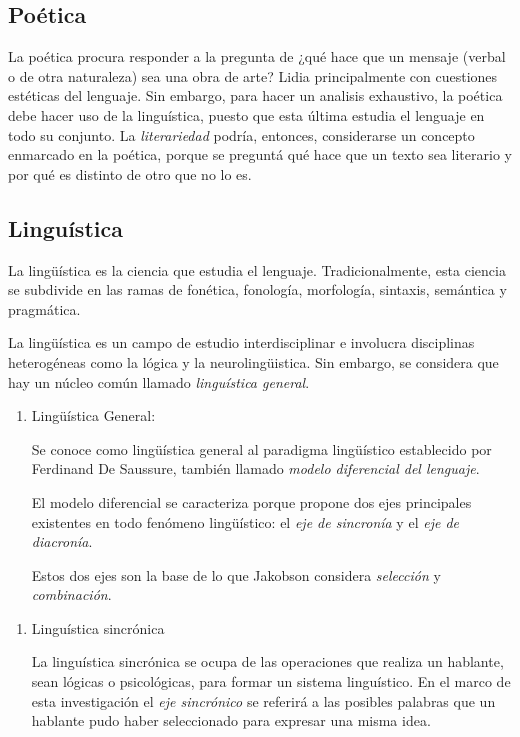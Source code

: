 \documentclass[twoside]{article}
\begin{document}
\subsection{Poética}
\label{sec:orgc57ddba}
La poética procura responder a la pregunta de ¿qué hace que un
mensaje (verbal o de otra naturaleza) sea una obra de arte? Lidia
principalmente con cuestiones estéticas del lenguaje. Sin embargo,
para hacer un analisis exhaustivo, la poética debe hacer uso de la
linguística, puesto que esta última estudia el lenguaje en todo su
conjunto. La \emph{literariedad} podría, entonces, considerarse un
concepto enmarcado en la poética, porque se preguntá qué hace que
un texto sea literario y por qué es distinto de otro que no lo es.

\subsection{Linguística}
\label{sec:org60730fe}



La lingüística es la ciencia que estudia el lenguaje.
Tradicionalmente, esta ciencia se subdivide en las ramas de fonética,
fonología, morfología, sintaxis, semántica y pragmática.

La lingüística es un campo de estudio interdisciplinar e involucra
disciplinas heterogéneas como la lógica y la neurolingüistica. Sin
embargo, se considera que hay un núcleo común llamado \emph{linguística
general}.

\begin{enumerate}
\item Lingüística General:

Se conoce como lingüística general al paradigma lingüístico
establecido por Ferdinand De Saussure, también llamado \emph{modelo
diferencial del lenguaje}.

El modelo diferencial se caracteriza porque propone dos ejes
principales existentes en todo fenómeno lingüístico: el \emph{eje de
sincronía} y el \emph{eje de diacronía}.

Estos dos ejes son la base de lo que Jakobson considera \emph{selección} y
\emph{combinación}.
\end{enumerate}


\begin{enumerate}
\item Linguística sincrónica

La linguística sincrónica se ocupa de las
operaciones que realiza un hablante, sean lógicas o psicológicas,
para formar un sistema linguístico. En el
marco de esta investigación el \emph{eje sincrónico} se referirá a las
posibles palabras que un hablante pudo haber seleccionado para
expresar una misma idea.
\end{enumerate}
\end{document}

